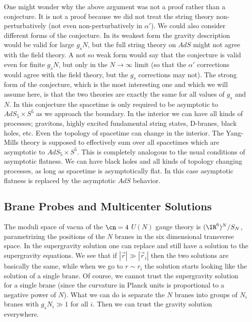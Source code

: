 One might wonder why the above argument was not a proof rather than
a conjecture. It is not a proof because we did not treat the string
theory non-perturbatively (not even  non-perturbatively in $\alpha'$).
We could also consider different forms of the conjecture. 
In its weakest form the gravity description would be valid
for large $g_s N$, but the full string theory on $AdS$ might not agree with
the field theory. A not so weak form would say that the conjecture 
is valid even for finite $g_s N$, but only in the $N \to \infty $ limit
(so that the $\alpha'$ corrections would agree with the field theory,
but the $g_s$ corrections may not).
The strong form of the conjecture, which is the most interesting one
and which we will assume here, 
is that the two theories are exactly the same for all values 
of $g_s$ and $N$. 
In this conjecture the spacetime is only required to be asymptotic
to $AdS_5\times S^5$ as we approach the boundary. In the interior we
can have all kinds of processes; gravitons, highly excited fundamental
string states, D-branes, black holes, etc. Even the topology of
spacetime can change in the interior. The Yang-Mills theory is
supposed to effectively sum over all spacetimes which are asymptotic 
to $AdS_5\times S^5$. This is  completely analogous to the usual 
conditions of asymptotic flatness. We can have black holes and all kinds
of topology changing processes, as long as spacetime is asymptotically 
flat. In this case asymptotic flatness is replaced by the asymptotic
$AdS$ behavior.

\subsection{Brane Probes and Multicenter Solutions}
\label{multicenter_sols}

The moduli space of vacua of the $\cn=4$ $U(N)$ 
gauge theory is $ (\IR^6)^N/S_N$, parametrizing the positions
of the $N$ branes in the six dimensional transverse space. 
In the supergravity solution one can replace 
and still have a solution to the supergravity equations.  We see that
if $|\vec r| \gg |\vec r_i |$ then the two solutions are basically the
same, while when we go to $r \sim r_i $ the solution starts looking
like the solution of a single brane. Of course, we cannot trust the
supergravity solution for a single brane (since the curvature in
Planck units is proportional to a negative power of $N$). What we can
do is separate the $N$ branes into groups of $N_i$ branes with
$g_s N_i \gg 1$ for all $i$. 
Then we can trust the gravity solution everywhere.

